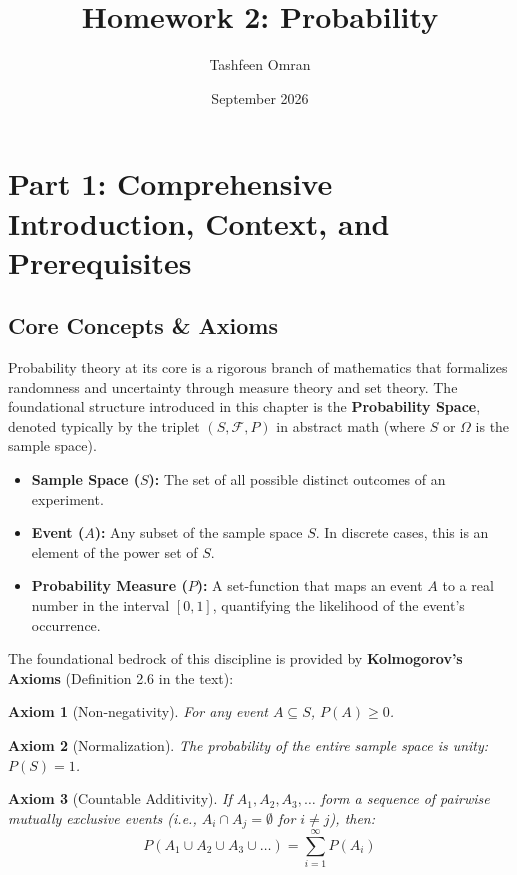 \documentclass[12pt]{article}
\title{Homework 2: Probability}
\author{Tashfeen Omran}
\date{September 2026}
\newtheorem{axiom}{Axiom}[section]
\begin{document}
\maketitle
\tableofcontents
\newpage

\section{Part 1: Comprehensive Introduction, Context, and Prerequisites}

\subsection{Core Concepts \& Axioms}
Probability theory at its core is a rigorous branch of mathematics that formalizes randomness and uncertainty through measure theory and set theory. The foundational structure introduced in this chapter is the \textbf{Probability Space}, denoted typically by the triplet $(S, \mathcal{F}, P)$ in abstract math (where $S$ or $\Omega$ is the sample space). 

\begin{itemize}
    \item \textbf{Sample Space ($S$):} The set of all possible distinct outcomes of an experiment.
    \item \textbf{Event ($A$):} Any subset of the sample space $S$. In discrete cases, this is an element of the power set of $S$. 
    \item \textbf{Probability Measure ($P$):} A set-function that maps an event $A$ to a real number in the interval $[0,1]$, quantifying the likelihood of the event's occurrence.
\end{itemize}

The foundational bedrock of this discipline is provided by \textbf{Kolmogorov's Axioms} (Definition 2.6 in the text):
\begin{axiom}[Non-negativity]
For any event $A \subseteq S$, $P(A) \geq 0$.
\end{axiom}
\begin{axiom}[Normalization]
The probability of the entire sample space is unity: $P(S) = 1$.
\end{axiom}
\begin{axiom}[Countable Additivity]
If $A_1, A_2, A_3, \dots$ form a sequence of pairwise mutually exclusive events (i.e., $A_i \cap A_j = \emptyset$ for $i \neq j$), then:
\[ P(A_1 \cup A_2 \cup A_3 \cup \dots) = \sum_{i=1}^{\infty} P(A_i) \]
\end{axiom}
\end{document}
